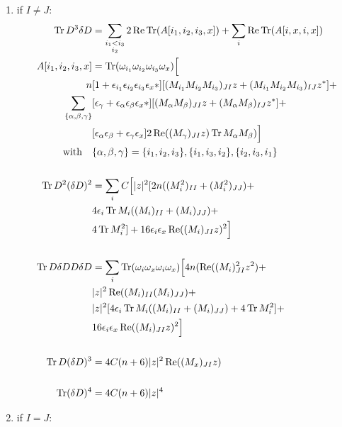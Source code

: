\begin{enumerate}
\item if $I \neq J$:
\begin{align}
\operatorname{Tr} D^3 \delta D &= \sum_{\substack{i_1 < i_3 \\ i_2}} 2 \operatorname{Re} \operatorname{Tr} (A[i_1, i_2, i_3, x]) + \sum_{i} \operatorname{Re} \operatorname{Tr} (A[i, x, i, x]) \notag \\
A[i_1, i_2, i_3, x] &= \operatorname{Tr} ( \omega_{i_1} \omega_{i_2} \omega_{i_3} \omega_x ) \Big[ \notag \\
n &[1 + \epsilon_{i_1} \epsilon_{i_2} \epsilon_{i_3} \epsilon_{x} *] [ (M_{i_1}M_{i_2}M_{i_3})_{JI} z + (M_{i_1}M_{i_2}M_{i_3})_{IJ} z^*] + \notag \\
\sum_{\{\alpha, \beta, \gamma\} }  & [\epsilon_{\gamma} + \epsilon_{\alpha} \epsilon_{\beta} \epsilon_x * ] [(M_{\alpha} M_{\beta})_{JI} z + (M_{\alpha} M_{\beta})_{IJ} z^* ] + \notag \\
& [\epsilon_{\alpha} \epsilon_{\beta}  + \epsilon_{\gamma} \epsilon_x] 2\operatorname{Re} ((M_{\gamma})_{JI} z)\operatorname{Tr} M_{\alpha} M_{\beta}) \Big] \\
\text{with} \quad &\{\alpha, \beta, \gamma\} = \{ i_1, i_2, i_3 \}, \{i_1, i_3, i_2 \}, \{ i_2, i_3, i_1 \} \notag \\
\notag \\
\operatorname{Tr} D^2 (\delta D)^2 &= \sum_{i} C \Big[ |z|^2 [ 2n((M_i^2)_{II} + (M_i^2)_{JJ}) + \notag \\
&4 \epsilon_i \operatorname{Tr} M_i ( (M_i)_{II} + (M_i)_{JJ} ) + \notag \\
&4 \operatorname{Tr} M_i^2 ] + 16 \epsilon_i \epsilon_x \operatorname{Re} ((M_i)_{JI} z)^2 \Big] \\
\notag \\
\operatorname{Tr} D \delta D D \delta D &= \sum_i \operatorname{Tr} ( \omega_{i} \omega_{x} \omega_{i} \omega_x ) \Big[ 4n ( \operatorname{Re}((M_i)_{JI}^2 z^2) + \notag \\
&|z|^2 \operatorname{Re} ( (M_i)_{II}(M_i)_{JJ}) + \notag \\
&|z|^2 [ 4 \epsilon_i \operatorname{Tr} M_i ((M_i)_{II} + (M_i)_{JJ} ) + 4 \operatorname{Tr} M_i^2 ] + \notag \\
&16 \epsilon_i \epsilon_x \operatorname{Re} ( (M_i)_{JI} z)^2 \Big] \\
\notag \\
\operatorname{Tr} D (\delta D)^3 &= 4 C (n+6) |z|^2 \operatorname{Re}( (M_x)_{JI} z ) \\
\notag \\
\operatorname{Tr} (\delta D)^4 &= 4 C (n+6) |z|^4
\end{align}
\item if $I = J$:
\begin{align}

\end{align}
\end{enumerate}
